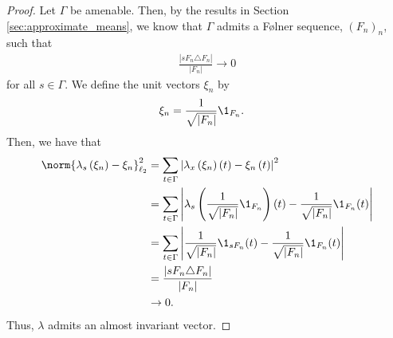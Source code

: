 \begin{proof}
  Let $\Gamma$ be amenable. Then, by the results in Section \ref{sec:approximate_means}, we know that $\Gamma$ admits a Følner sequence, $\left( F_n \right)_{n}$, such that
  \begin{align*}
    \frac{\left\vert sF_n\triangle F_n \right\vert}{\left\vert F_n \right\vert} \rightarrow 0
  \end{align*}
  for all $s\in\Gamma$. We define the unit vectors $\xi_n$ by
  \begin{align*}
    \xi_n &= \frac{1}{\sqrt{\left\vert F_n \right\vert}} \1_{F_n}.
  \end{align*}
  Then, we have that
  \begin{align*}
    \norm{\lambda_s\left( \xi_n \right) - \xi_n}_{\ell_2}^2 &= \sum_{t\in\Gamma}\left\vert \lambda_x\left( \xi_n \right)\left( t \right) - \xi_n\left( t \right) \right\vert^2\\
                                                            &= \sum_{t\in\Gamma}\left\vert \lambda_s\left( \frac{1}{\sqrt{\left\vert F_n \right\vert}}\1_{F_n} \right)(t) - \frac{1}{\sqrt{\left\vert F_n \right\vert}}\1_{F_n}(t) \right\vert\\
                                                            &= \sum_{t\in\Gamma}\left\vert \frac{1}{\sqrt{\left\vert F_n \right\vert}}\1_{sF_n}(t) - \frac{1}{\sqrt{\left\vert F_n \right\vert}}\1_{F_n}(t) \right\vert\\
                                                            &= \frac{\left\vert sF_n\triangle F_n \right\vert}{\left\vert F_n \right\vert}\\
                                                            &\rightarrow 0.
  \end{align*}
  Thus, $\lambda$ admits an almost invariant vector.\newline


\end{proof}
